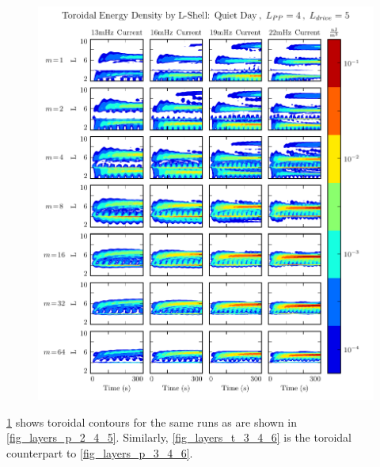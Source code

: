 \begin{figure}[!htb]
    \centering
    \includegraphics[width=\textwidth]{figures/layers_t_2_4_5.pdf}
    \caption[Radial Distribution of Toroidal Energy: Quiet Day]{
      \todo{$\cdots$}
    }
    \label{fig_layers_t_2_4_5}
\end{figure}

\cref{fig_layers_t_2_4_5} shows toroidal contours for the same runs as are shown in \cref{fig_layers_p_2_4_5}. Similarly, \cref{fig_layers_t_3_4_6} is the toroidal counterpart to \cref{fig_layers_p_3_4_6}. 


